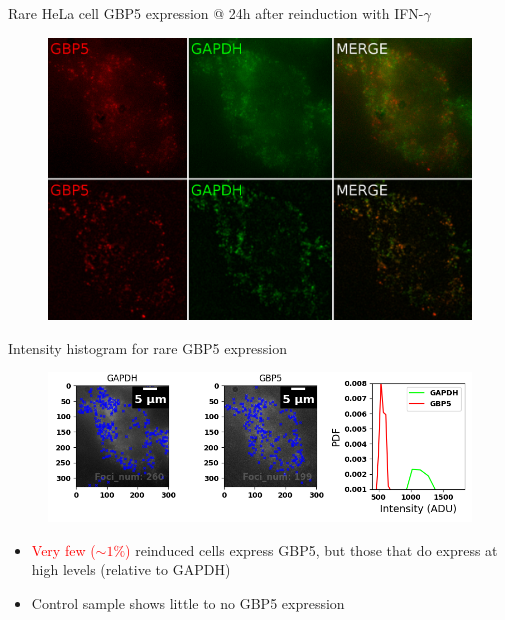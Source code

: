 \documentclass[aspectratio=1610]{beamer}					%
\begin{document}
\begin{frame}{Rare HeLa cell GBP5 expression @ 24h after reinduction with IFN-$\gamma$}
\begin{figure}
\includegraphics[width=12cm]{Stains.png}
\end{figure}
\end{frame}

\begin{frame}{Intensity histogram for rare GBP5 expression}
\begin{figure}
\includegraphics[width=14cm]{Detection.png}
\end{figure}
\begin{itemize}
\item \textcolor{red}{Very few ($\sim 1\%$)} reinduced cells express GBP5, but those that do express at high levels (relative to GAPDH)
\item Control sample shows little to no GBP5 expression
\end{itemize}
\end{frame}
\end{document}
